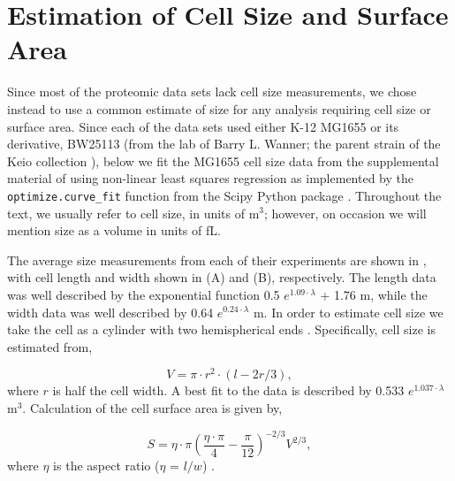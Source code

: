 \section{Estimation of Cell Size and Surface Area}
\label{sec:protein_size_SV} Since most of the proteomic data sets lack cell size
measurements, we chose instead to use a common estimate of size
for any analysis requiring cell size or surface area. Since each of the data
sets used either K-12 MG1655 or its derivative, BW25113 (from the lab of Barry
L. Wanner; the parent strain of the Keio collection \citep{datsenko2000,
baba2006}), below we fit the MG1655 cell size data from the supplemental material of
\cite{si2017, si2019} using non-linear least squares regression as implemented by the \texttt{optimize.curve\_fit} function from the Scipy
Python package \citep{2020scipynmeth}. Throughout
the text, we usually refer to cell size, in units of \textmu m$^3$; however,
on occasion we will mention size as a volume in units of fL.

The average size measurements from each of their experiments are shown in
, with  cell length and width shown in (A) and (B),
respectively. The length data was well described by the exponential function 0.5
$e^{1.09 \cdot \lambda}$ + 1.76 \textmu m, while the width data was well
described by 0.64 $e^{0.24 \cdot \lambda}$ \textmu m. In order to estimate cell
size we take the cell as a cylinder with two hemispherical ends \citep{si2017,
basan2015}. Specifically,  cell size  is estimated from,

\begin{equation}
V = \pi \cdot r^2 \cdot (l - 2r/3),
\label{eq:cell_size}
\end{equation}
where $r$ is half the cell width. A best fit to the data is described by 0.533
$e^{1.037 \cdot \lambda}$ \textmu m$^3$. Calculation of the cell surface area is
given by,

\begin{equation}
 S = \eta \cdot \pi (\frac{\eta \cdot \pi}{4} - \frac{\pi}{12})^{-2/3} V^{2/3},
 \label{eq:surface_area}
\end{equation}
where $\eta$ is the aspect ratio ($\eta$ = $l/w$) \citep{ojkic2019}.

